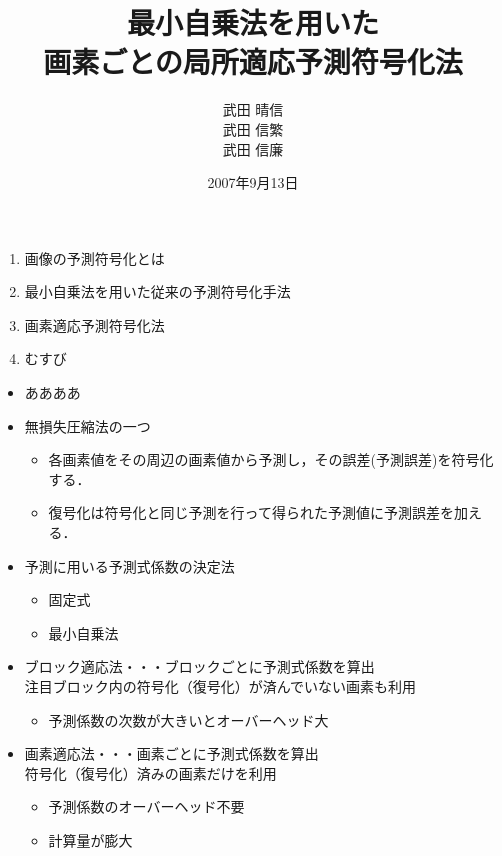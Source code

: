 \documentclass[25pt,landscape,dvipdfmx,uplatex]{foils}
\title{\vspace{2cm}最小自乗法を用いた\\画素ごとの局所適応予測符号化法}
\date{2007年9月13日}
\author{
武田 晴信\\
武田 信繁\\
武田 信廉\\
}
\begin{document}
\maketitle
\begin{enumerate}
 \item 画像の予測符号化とは
 \item 最小自乗法を用いた従来の予測符号化手法
 \item 画素適応予測符号化法
 \item むすび
\end{enumerate}
      
\begin{itemize}
 \item ああああ
 \item 無損失圧縮法の一つ
       \begin{itemize}
        \item 各画素値をその周辺の画素値から予測し，その誤差(予測誤差)を符号化する．
        \item 復号化は符号化と同じ予測を行って得られた予測値に予測誤差を加える．
       \end{itemize}
 \item 予測に用いる予測式係数の決定法
 \begin{itemize}
  \item 固定式
  \item 最小自乗法
 \end{itemize}
\end{itemize}
\begin{itemize}
 \item {\large ブロック適応法・・・ブロックごとに予測式係数を算出}\\
       注目ブロック内の符号化（復号化）が済んでいない画素も利用
 \begin{itemize}
  \item 予測係数の次数が大きいとオーバーヘッド大
 \end{itemize}
 \item {\large 画素適応法・・・画素ごとに予測式係数を算出}\\
       符号化（復号化）済みの画素だけを利用
 \begin{itemize}
  \item 予測係数のオーバーヘッド不要
  \item 計算量が膨大
 \end{itemize}
\end{itemize}
\end{document}

